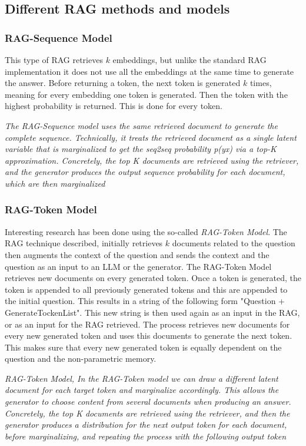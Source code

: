\documentclass{wseas}
\begin{document}
\subsection{Different RAG methods and
models}

\subsubsection{RAG-Sequence Model}

This type of RAG retrieves \(k\) embeddings, but unlike the standard RAG
implementation it does not use all the embeddings at the same time to
generate the answer. Before returning a token, the next token is
generated \(k\) times, meaning for every embedding one token is
generated. Then the token with the highest probability is returned. This
is done for every token.

\emph{The RAG-Sequence model uses the same retrieved document to
generate the complete sequence. Technically, it treats the retrieved
document as a single latent variable that is marginalized to get the
seq2seq probability p(y\textbar x) via a top-K approximation.
Concretely, the top K documents are retrieved using the retriever, and
the generator produces the output sequence probability for each
document, which are then marginalized} \cite{cite3}

\subsubsection{RAG-Token Model}

Interesting research has been done using the so-called \emph{RAG-Token
Model}. The RAG technique described, initially retrieves \(k\) documents
related to the question then augments the context of the question and
sends the context and the question as an input to an LLM or the
generator. The RAG-Token Model retrieves new documents on every
generated token. Once a token is generated, the token is appended to all
previously generated tokens and this are appended to the initial
question. This results in a string of the following form "Question +
GenerateTockenList". This new string is then used again as an input in
the RAG, or as an input for the RAG retrieved. The process retrieves new
documents for every new generated token and uses this documents to
generate the next token. This makes sure that every new generated token
is equally dependent on the question and the non-parametric memory.

\emph{RAG-Token Model, In the RAG-Token model we can draw a different
latent document for each target token and marginalize accordingly. This
allows the generator to choose content from several documents when
producing an answer. Concretely, the top K documents are retrieved using
the retriever, and then the generator produces a distribution for the
next output token for each document, before marginalizing, and repeating
the process with the following output token}
\cite{cite3}
\end{document}
